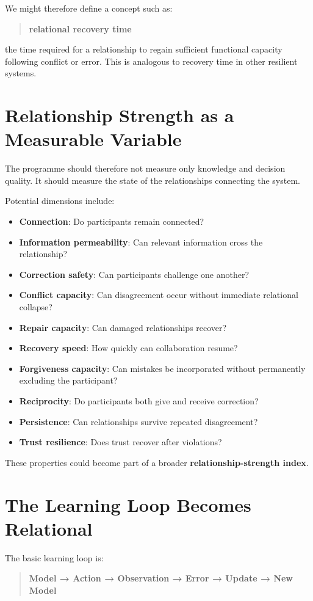 \documentclass{article}
\begin{document}
We might therefore define a concept such as:
\begin{quote}
    \textbf{relational recovery time}
\end{quote}
the time required for a relationship to regain sufficient functional capacity following conflict or error. This is analogous to recovery time in other resilient systems.

\section{Relationship Strength as a Measurable Variable}
The programme should therefore not measure only knowledge and decision quality. It should measure the state of the relationships connecting the system.

Potential dimensions include:
\begin{itemize}
    \item \textbf{Connection}: Do participants remain connected?
    \item \textbf{Information permeability}: Can relevant information cross the relationship?
    \item \textbf{Correction safety}: Can participants challenge one another?
    \item \textbf{Conflict capacity}: Can disagreement occur without immediate relational collapse?
    \item \textbf{Repair capacity}: Can damaged relationships recover?
    \item \textbf{Recovery speed}: How quickly can collaboration resume?
    \item \textbf{Forgiveness capacity}: Can mistakes be incorporated without permanently excluding the participant?
    \item \textbf{Reciprocity}: Do participants both give and receive correction?
    \item \textbf{Persistence}: Can relationships survive repeated disagreement?
    \item \textbf{Trust resilience}: Does trust recover after violations?
\end{itemize}

These properties could become part of a broader \textbf{relationship-strength index}.

\section{The Learning Loop Becomes Relational}
The basic learning loop is:
\begin{quote}
    \textbf{Model → Action → Observation → Error → Update → New Model}
\end{quote}
\end{document}
